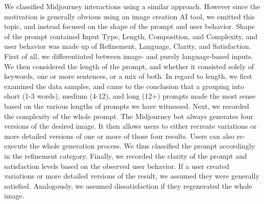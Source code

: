 We classified Midjourney interactions using a similar approach.
However since the motivation is generally obvious using an image creation AI tool, we emitted this
topic, and instead focused on the shape of the prompt and user behavior.
Shape of the prompt contained Input Type, Length, Composition, and Complexity,
and user behavior was made up of Refinement, Language, Clarity, and Satisfaction.
First of all, we differentiated between image- and purely language-based inputs.
We then considered the length of the prompt, and whether it consisted solely of keywords, one
or more sentences, or a mix of both.
In regard to length, we first examined the data samples, and came to the conclusion that a
grouping into short (1-3 words), medium (4-12), and long (12+) prompts made the most sense based
on the various lengths of prompts we have witnessed.
Next, we recorded the complexity of the whole prompt.
The Midjourney bot always generates four versions of the desired image.
It then allows users to either recreate variations or more detailed versions of one or more of
those four results.
Users can also re-execute the whole generation process.
We thus classified the prompt accordingly in the refinement category.
Finally, we recorded the clarity of the prompt and satisfaction levels based
on the observed user behavior.
If a user created variations or more detailed versions of the result, we assumed they were
generally satisfied.
Analogously, we assumed dissatisfaction if they regenerated the whole image.

